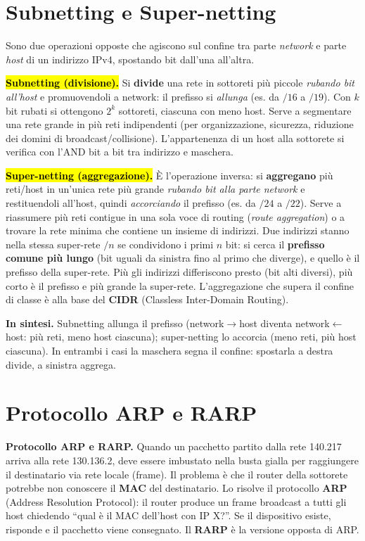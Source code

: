 \documentclass[11pt,a4paper]{report}
\newcommand{\pagemark}[1]{\marginpar{\footnotesize\color{gray}p.#1}}
\begin{document}
\section{Subnetting e Super-netting}
 Sono due operazioni opposte che agiscono
sul confine tra parte \emph{network} e parte \emph{host} di un indirizzo IPv4,
spostando bit dall'una all'altra.

\hl{\textbf{Subnetting (divisione).}} Si \textbf{divide} una rete in sottoreti più
piccole \emph{rubando bit all'host} e promuovendoli a network: il prefisso si
\emph{allunga} (es. da $/16$ a $/19$). Con $k$ bit rubati si ottengono $2^k$
sottoreti, ciascuna con meno host. Serve a segmentare una rete grande in più reti
indipendenti (per organizzazione, sicurezza, riduzione dei domini di
broadcast/collisione). L'appartenenza di un host alla sottorete si verifica con
l'AND bit a bit tra indirizzo e maschera.

\hl{\textbf{Super-netting (aggregazione).}} È l'operazione inversa: si
\textbf{aggregano} più reti/host in un'unica rete più grande \emph{rubando bit
alla parte network} e restituendoli all'host, quindi \emph{accorciando} il
prefisso (es. da $/24$ a $/22$). Serve a riassumere più reti contigue in una sola
voce di routing (\emph{route aggregation}) o a trovare la rete minima che
contiene un insieme di indirizzi. Due indirizzi stanno nella stessa super-rete
$/n$ se condividono i primi $n$ bit: si cerca il \textbf{prefisso comune più
lungo} (bit uguali da sinistra fino al primo che diverge), e quello è il prefisso
della super-rete. Più gli indirizzi differiscono presto (bit alti diversi), più
corto è il prefisso e più grande la super-rete. L'aggregazione che supera il
confine di classe è alla base del \textbf{CIDR} (Classless Inter-Domain Routing).

\textbf{In sintesi.} Subnetting allunga il prefisso (network$\to$host diventa
network$\leftarrow$host: più reti, meno host ciascuna); super-netting lo accorcia
(meno reti, più host ciascuna). In entrambi i casi la maschera segna il confine:
spostarla a destra divide, a sinistra aggrega.

\section{Protocollo ARP e RARP}\pagemark{21}
\textbf{Protocollo ARP e RARP.} Quando un pacchetto partito dalla rete 140.217 arriva alla rete 130.136.2, deve essere imbustato nella busta gialla per raggiungere il destinatario via rete locale (frame). Il problema è che il router della sottorete potrebbe non conoscere il \textbf{MAC} del destinatario. Lo risolve il protocollo \textbf{ARP} (Address Resolution Protocol): il router produce un frame broadcast a tutti gli host chiedendo ``qual è il MAC dell'host con IP X?''. Se il dispositivo esiste, risponde e il pacchetto viene consegnato. Il \textbf{RARP} è la versione opposta di ARP.
\end{document}
